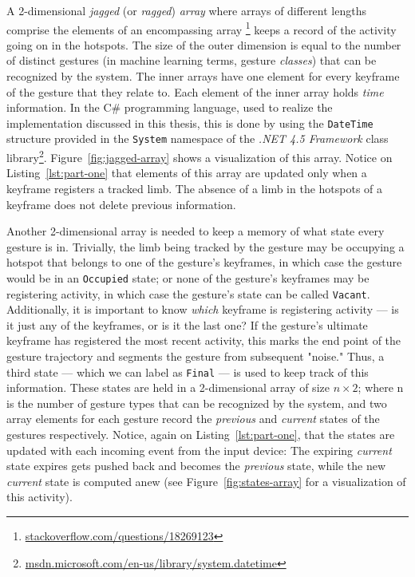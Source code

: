A 2-dimensional \emph{jagged} (or \emph{ragged}) \emph{array} where arrays of different lengths comprise the elements of an encompassing array \footnote{\href{http://stackoverflow.com/questions/18269123/}{stackoverflow.com/questions/18269123}} keeps a record of the activity going on in the hotspots. The size of the outer dimension is equal to the number of distinct gestures (in machine learning terms, gesture \emph{classes}) that can be recognized by the system. The inner arrays have one element for every keyframe of the gesture that they relate to. Each element of the inner array holds \emph{time} information. In the C\# programming language, used to realize the implementation discussed in this thesis, this is done by using the \lstinline|DateTime| structure provided in the \lstinline|System| namespace of the \emph{.NET 4.5 Framework} class library\footnote{\href{http://msdn.microsoft.com/en-us/library/system.datetime}{msdn.microsoft.com/en-us/library/system.datetime}}. Figure~\ref{fig:jagged-array} shows a visualization of this array. Notice on Listing~\ref{lst:part-one} that elements of this array are updated only when a keyframe registers a tracked limb. The absence of a limb in the hotspots of a keyframe does not delete previous information.

Another 2-dimensional array is needed to keep a memory of what state every gesture is in. Trivially, the limb being tracked by the gesture may be occupying a hotspot that belongs to one of the gesture's keyframes, in which case the gesture would be in an \lstinline|Occupied| state; or none of the gesture's keyframes may be registering activity, in which case the gesture's state can be called \lstinline|Vacant|. Additionally, it is important to know \emph{which} keyframe is registering activity --- is it just any of the keyframes, or is it the last one? If the gesture's ultimate keyframe has registered the most recent activity, this marks the end point of the gesture trajectory and segments the gesture from subsequent "noise." Thus, a third state --- which we can label as \lstinline|Final| --- is used to keep track of this information. These states are held in a 2-dimensional array of size $n \times 2$; where n is the number of gesture types that can be recognized by the system, and two array elements for each gesture record the \emph{previous} and \emph{current} states of the gestures respectively. Notice, again on Listing~\ref{lst:part-one}, that the states are updated with each incoming event from the input device: The expiring \emph{current} state expires gets pushed back and becomes the \emph{previous} state, while the new \emph{current} state is computed anew (see Figure~\ref{fig:states-array} for a visualization of this activity).

